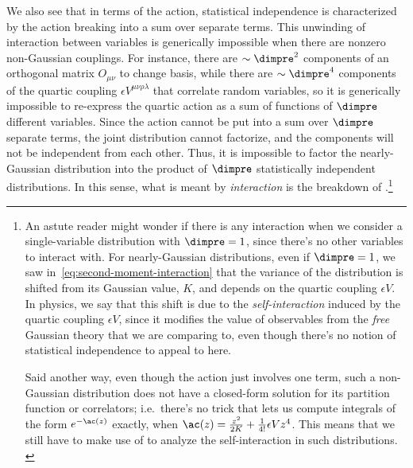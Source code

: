 We also see that in terms of the action, statistical independence is characterized by the action breaking into a sum over separate terms.
This unwinding of interaction between variables is generically impossible when there are nonzero non-Gaussian couplings.
For instance, there are $\sim \dimpre^2$ components of an orthogonal matrix $O_{\mu\nu}$ to change basis, while there are $\sim \dimpre^4$ components of the quartic coupling $\epsilon V^{\mu\nu\rho\lambda}$ that correlate random variables, so it is generically impossible to re-express  the quartic action as a sum of functions of $\dimpre$ different variables. Since the action cannot be put into
a sum over $\dimpre$ separate terms,
the joint distribution cannot factorize, and the components will not be independent from each other.
Thus, it is impossible to factor the nearly-Gaussian distribution into the product of $\dimpre$ statistically independent distributions.
In this sense, what is meant by \emph{interaction} is the breakdown of .\footnote{
An astute reader might wonder if there is any interaction when we consider a single-variable distribution with $\dimpre = 1$, since there's no other variables to interact with. For nearly-Gaussian distributions, even if $\dimpre=1$, we saw in~\eqref{eq:second-moment-interaction} that the variance of the distribution is shifted from its Gaussian value, $K$, and depends on the quartic coupling $\epsilon V$. In physics, we say that
this shift is due to the \emph{self-interaction} induced by the quartic coupling $\epsilon V$,
since it modifies the value of observables from the \emph{free} Gaussian theory that we are comparing to, even though there's no notion of statistical independence to appeal to here.

Said another way, even though the action just involves one term, such a non-Gaussian distribution does not have a closed-form solution for its partition function or correlators; i.e.~there's no trick that lets us compute integrals of the form $e^{-\ac(z)}$ exactly, when $\ac(z) = \frac{z^2}{2K} + \frac{1}{4!} \epsilon Vz^4$. This means that we still have to make use of  to analyze the self-interaction in such distributions.
\label{footnote:self-interaction}
}






































